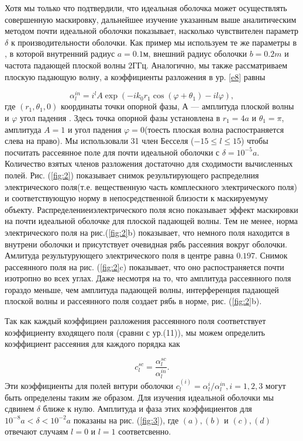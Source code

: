\documentclass[a4paper, 12pt]{article}
\begin{document}
Хотя мы только что подтвердили, что идеальная оболочка может осуществлять совершенную маскировку, дальнейшее изучение
указанным выше аналитическим методом почти идеальной оболочки показывает, насколько чувствителен параметр $\delta$ к 
производительности оболочки. Как пример мы используем те же параметры в \cite{6}, в которой внутренний радиус $a=0.1м$,
внешний радиус оболочки $b=0.2m$ и частота падающей плоской волны $2ГГц$. Аналогично, мы также рассматриваем плоскую
падающую волну, а коэффициенты разложения в ур. \eqref{e8} равны
 
\begin{equation}
	\alpha_l^{in} = i^l A \exp(-ik_0r_1\cos(\varphi+\theta_1)-il\varphi),
\end{equation}
где $(r_1, \theta_1, 0)$ координаты точки опорной фазы, А --- амплитуда плоской волны и $\varphi$ угол падения \cite{13}.
Здесь точка опорной фазы установлена в $r_1=4a$ и $\theta_1=\pi$, амплитуда $A=1$ и угол падения $\varphi=0$(тоесть 
плоская волна распостраняется слева на право). Мы использовали 31 член Бесселя ($-15 \le l \le 15$) чтобы посчитать
рассеянное поле для почти идеальной оболочки с $\delta=10^{-5}a$. Количество взятых членов разложения достаточно для
сходимости вычисленных полей. Рис. (\ref{fig:2}) показывает снимок результирующего распределния электрического поля(т.е. 
вещественную часть комплескного электрического поля) и соответствующую норму в непосредственной близости к маскируемуму 
объекту. Распределениеиэлектрического поля ясно показывает эффект маскировки на почти идеальной оболочке для плоской
падающей волны. Тем не менее, норма электрического поля на рис.(\ref{fig:2}b) показывает, что немного поля находится в
внутрени оболочки и присутствует очевидная рябь рассеяния вокруг оболочки. Амлитуда результурующего электрического поля
в центре равна $0.197$. Снимок рассеянного поля на рис. (\ref{fig:2}c) показывает, что оно распостраняется почти изотропно
во всех углах. Даже несмотря на то, что амплитуда рассеянного поля гораздо меньше, чем амплитуда падающей волны, 
интерференция падающей плоской волны и рассеянного поля создает рябь в норме, рис. (\ref{fig:2}b).

Так как каждый коэффициен разложения рассеянного поля соответствует коэффициенту входящего поля (сравни с ур.(11)), мы
можем определить коэффициент рассеяния для каждого порядка как

\begin{equation}
	c_l^{sc} = \frac{\alpha_l^{sc}}{\alpha_l^{in}}.
\end{equation}
Эти коэффициенты для полей внтури оболочки $c_l^{(i)}= \alpha_l^{i}/\alpha_l^{in}, i=1,2,3$ могут быть определены таким же
образом. Для изучения идеальной оболочки мы сдвинем $\delta$ ближе к нулю. Амплитуда и фаза этих коэффициентов для
$10^{-8}a<\delta<10^{-2}a$ показаны на рис. (\ref{fig:3}), где $(a),(b)$ и $(c),(d)$ отвечают случаям $l=0$ и $l=1$
соответсвенно.
\end{document}
